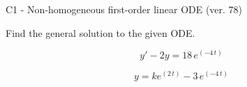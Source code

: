 \begin{exercise}
  \begin{exerciseTitle}C1 - Non-homogeneous first-order linear ODE (ver. 78)\end{exerciseTitle}
  \begin{exerciseStatement}
    
Find the general solution to the given ODE.

    
\[y'-2y= 18 \, e^{\left(-4 \, t\right)}\]

  \end{exerciseStatement}
  \begin{exerciseAnswer}
    
\[y= k e^{\left(2 \, t\right)} - 3 \, e^{\left(-4 \, t\right)}\]

  \end{exerciseAnswer}
\end{exercise}